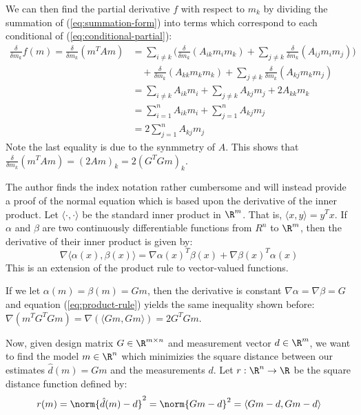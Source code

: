 \documentclass{homework}
\begin{document}
\renewcommand{\partial}[1]{\frac{\delta}{\delta #1}}

We can then find the partial derivative $f$ with respect to $m_k$ by dividing the summation of (\ref{eq:summation-form}) into terms which correspond
to each conditional of (\ref{eq:conditional-partial}):
\begin{align*}
    \frac{\delta}{\delta m_k} f(m) = \frac{\delta}{\delta m_k} (m^T A m) &=
        \sum_{i\neq k} \biggl(\partial{m_k} ( A_{ik} m_i m_k) + \sum_{j\neq k} \partial{m_k} (A_{ij} m_i m_j) \biggr) \\
        &\quad + \partial{m_k} (A_{kk} m_k m_k) + \sum_{j\neq k} \partial{m_k} (A_{kj} m_k m_j) \\
        &= \sum_{i\neq k} A_{ik} m_i + \sum_{j \neq k} A_{kj} m_j + 2 A_{kk} m_k \\
        &= \sum_{i=1}^{n} A_{ik} m_i + \sum_{j=1}^{n} A_{kj} m_j \\
        &= 2 \sum_{j=1}^{n} A_{kj} m_j
\end{align*}
Note the last equality is due to the synmmetry of $A$. This shows that $\partial{m_k} (m^T A m) = (2Am)_k = 2(G^T Gm)_k$.

\newcommand{\inner}[2]{\langle #1, #2 \rangle}

The author finds the index notation rather cumbersome and will instead provide a proof of the normal equation which is 
based upon the derivative of the inner product. Let $\inner{\cdot}{\cdot}$ be the standard inner product in $\R^m$. That is,
$\inner{x}{y} = y^T x$. If $\alpha$ and $\beta$ are two continuously differentiable functions from $R^n$ to $\R^m$, then
the derivative of their inner product is given by:
\begin{equation}
    \nabla \inner{\alpha(x)}{\beta(x)} = \nabla \alpha(x)^T \beta (x) + \nabla \beta(x)^T \alpha(x)
    \label{eq:product-rule}
\end{equation}
This is an extension of the product rule to vector-valued functions.

If we let $\alpha(m) = \beta(m) = Gm$, then the derivative is constant $\nabla \alpha = \nabla \beta = G$ and equation
(\ref{eq:product-rule}) yields the same inequality shown before: $\nabla (m^T G^T G m) = \nabla (\inner{Gm}{Gm}) = 2 G^T Gm$.

Now, given design matrix $G\in\R^{m\times n}$ and measurement vector $d \in\R^m$, we want to find the model $m\in\R^n$ which minimizies
the square distance between our estimates $\hat{d}(m) = Gm$ and the measurements $d$. Let $r: \R^n \to \R$ be the square distance
function defined by:
\begin{equation*}
    r(m) = \norm{\hat{d}(m) - d}^2 = \norm{Gm - d}^2 = \inner{Gm-d}{Gm-d}
\end{equation*}
\end{document}
